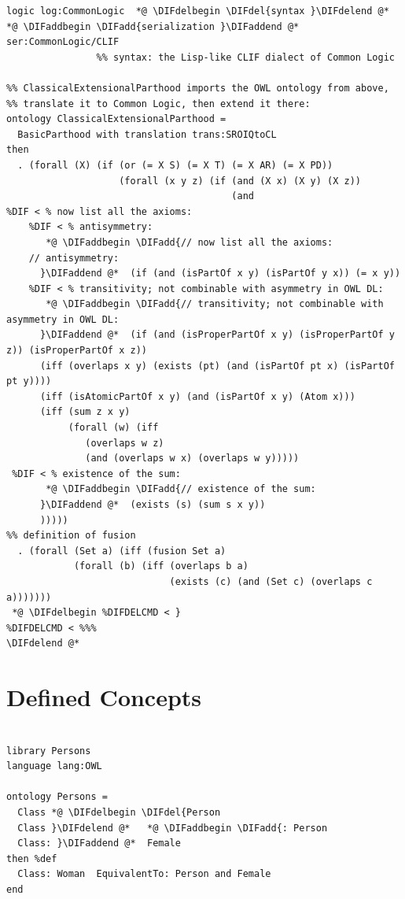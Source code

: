 \documentclass[10pt,fleqn,final]{scrreprt}
\newcommand{\sclause}[1]{\section{#1}}
\providecommand{\DIFadd}[1]{{\protect\color{blue}\uwave{#1}}} %
\providecommand{\DIFdel}[1]{{\protect\color{red}\sout{#1}}}                      %
\providecommand{\DIFaddbegin}{} %
\providecommand{\DIFaddend}{} %
\providecommand{\DIFdelbegin}{} %
\providecommand{\DIFdelend}{} %
\begin{document}
\begin{lstlisting}[basicstyle=\ttfamily,language=dolText,alsolanguage=owl2Manchester,alsolanguage=clif,escapechar=@,mathescape]
logic log:CommonLogic  *@ \DIFdelbegin \DIFdel{syntax }\DIFdelend @*   *@ \DIFaddbegin \DIFadd{serialization }\DIFaddend @*  ser:CommonLogic/CLIF
                %% syntax: the Lisp-like CLIF dialect of Common Logic

%% ClassicalExtensionalParthood imports the OWL ontology from above, 
%% translate it to Common Logic, then extend it there:
ontology ClassicalExtensionalParthood =
  BasicParthood with translation trans:SROIQtoCL
then
  . (forall (X) (if (or (= X S) (= X T) (= X AR) (= X PD))
                    (forall (x y z) (if (and (X x) (X y) (X z))
                                        (and                          
%DIF < % now list all the axioms: 
	%DIF < % antisymmetry:
       *@ \DIFaddbegin \DIFadd{// now list all the axioms: 
	// antisymmetry:
      }\DIFaddend @*  (if (and (isPartOf x y) (isPartOf y x)) (= x y)) 
	%DIF < % transitivity; not combinable with asymmetry in OWL DL:
       *@ \DIFaddbegin \DIFadd{// transitivity; not combinable with asymmetry in OWL DL:
      }\DIFaddend @*  (if (and (isProperPartOf x y) (isProperPartOf y z)) (isProperPartOf x z))
      (iff (overlaps x y) (exists (pt) (and (isPartOf pt x) (isPartOf pt y))))
      (iff (isAtomicPartOf x y) (and (isPartOf x y) (Atom x)))
      (iff (sum z x y)
           (forall (w) (iff 
		   	  (overlaps w z) 
			  (and (overlaps w x) (overlaps w y)))))
 %DIF < % existence of the sum:
       *@ \DIFaddbegin \DIFadd{// existence of the sum:
      }\DIFaddend @*  (exists (s) (sum s x y))                                          
      )))))
%% definition of fusion	  
  . (forall (Set a) (iff (fusion Set a)                                  
            (forall (b) (iff (overlaps b a)
                             (exists (c) (and (Set c) (overlaps c a)))))))
 *@ \DIFdelbegin %DIFDELCMD < }
%DIFDELCMD < %%%
\DIFdelend @*
\end{lstlisting}


\sclause{Defined Concepts} \label{ex:definedconcepts}

\begin{lstlisting}[basicstyle=\ttfamily,language=dolText,alsolanguage=OWL2manchester,escapechar=@,mathescape]
%prefix( lang:  <http://purl.net/DOL/languages/> )%

library Persons
language lang:OWL

ontology Persons =
  Class *@ \DIFdelbegin \DIFdel{Person
  Class }\DIFdelend @*   *@ \DIFaddbegin \DIFadd{: Person
  Class: }\DIFaddend @*  Female
then %def
  Class: Woman  EquivalentTo: Person and Female
end
\end{lstlisting}
\end{document}
